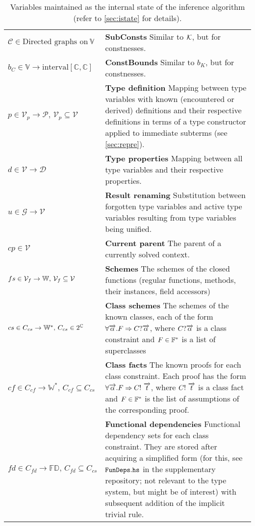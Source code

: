 \begin{table}
\begin{tabular}{p{.23\linewidth}p{.7\linewidth}}
  $\mathcal{C} \in \text{Directed graphs on}\ \mathbb{V}$ & \textbf{SubConsts}\quad
  Similar to $\mathcal{K}$, but for constnesses. \\

  $b_C \in \mathbb{V} \to \text{interval} \left[\mathbb{C}, \mathbb{C}\right]$ & \textbf{ConstBounds}\quad
  Similar to $b_K$, but for constnesses. \\

  $p \in \mathcal{V}_p \to \mathcal{P},\,\mathcal{V}_p \subseteq \mathcal{V}$ & \textbf{Type definition}\quad
  Mapping between type variables with known (encountered or derived) definitions and their respective definitions in terms of a type constructor applied to immediate subterms (see \cref{sec:repre}). \\

  $d \in \mathcal{V} \to \mathcal{D}$ & \textbf{Type properties}\quad
  Mapping between all type variables and their respective properties. \\

  $u \in \mathcal{G} \to \mathcal{V}$ & \textbf{Result renaming}\quad
  Substitution between forgotten type variables and active type variables resulting from type variables being unified. \\

  $cp \in \mathcal{V}$ & \textbf{Current parent}\quad
  The parent of a currently solved context. \\

  $fs \in \mathcal{V}_f \to \mathbb{W},\,\mathcal V_f \subseteq \mathcal V$ & \textbf{Schemes}\quad
  The schemes of the closed functions (regular functions, methods, their instances, field accessors) \\

  $cs \in C_{cs} \to \mathbb{W}^\ast,\,C_{cs} \in 2^{\mathbb{C}}$ & \textbf{Class schemes}\quad
  The schemes of the known classes, each of the form $\forall \overrightarrow{\alpha} . F \Rightarrow C?  \overrightarrow{\alpha}$, where $C?  \overrightarrow{\alpha}$ is a class constraint and $F \in {\mathbb{F}}^\ast$ is a list of superclasses \\

  $cf \in C_{cf} \to \mathbb{W}^\ast,\,C_{cf} \subseteq C_{cs}$ & \textbf{Class facts}\quad
  The known proofs for each class constraint. Each proof has the form $\forall \overrightarrow{\alpha} . F \Rightarrow C!\ \overrightarrow{t}$, where $C!\ \overrightarrow{t}$ is a class fact and $F \in {\mathbb{F}}^\ast$ is the list of assumptions of the corresponding proof. \\

  $fd \in C_{fd} \to \mathbb{FD},\,C_{fd} \subseteq C_{cs}$ & \textbf{Functional dependencies}\quad
  Functional dependency sets for each class constraint. They are stored after acquiring a simplified form (for this, see $\mathtt{FunDeps.hs}$ in the supplementary repository; not relevant to the type system, but might be of interest) with subsequent addition of the implicit trivial rule. \\
\bottomrule
\end{tabular}
\caption{Variables maintained as the internal state of the inference algorithm (refer to \cref{sec:istate} for details).}
\label{tab:istate}
\end{table}

